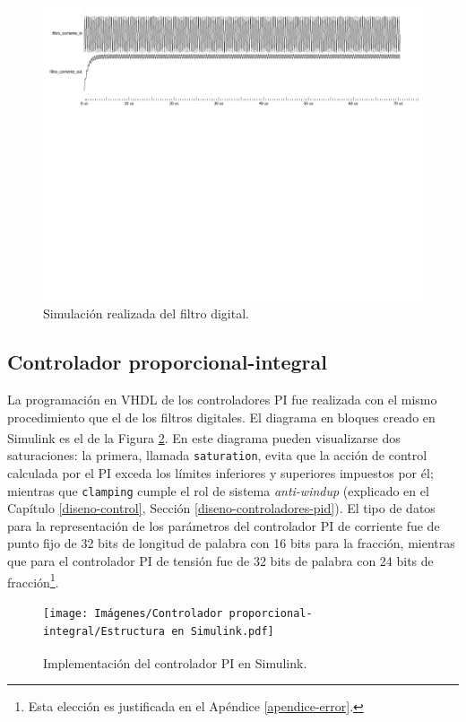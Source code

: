 \begin{figure}[hbt!]
    \centering
    \includegraphics[width=0.85\columnwidth]{Imágenes/Filtro digital/Simulación en ModelSim.pdf}    
    \caption{Simulación realizada del filtro digital.}
    \label{simulacion-filtro}
\end{figure} 

\subsection{Controlador proporcional-integral}
\label{implementacion-pid}

La programación en VHDL de los controladores PI fue realizada con el mismo procedimiento que el de los filtros digitales. El diagrama en bloques creado en Simulink\textsuperscript\textregistered\hspace{0.05pt} es el de la Figura \ref{estructura-pi}. En este diagrama pueden visualizarse dos saturaciones: la primera, llamada \texttt{saturation}, evita que la acción de control calculada por el PI exceda los límites inferiores y superiores impuestos por él; mientras que \texttt{clamping} cumple el rol de sistema \emph{anti-windup} (explicado en el Capítulo \ref{diseno-control}, Sección \ref{diseno-controladores-pid}). El tipo de datos para la representación de los parámetros del controlador PI de corriente fue de punto fijo de 32 bits de longitud de palabra con 16 bits para la fracción, mientras que para el controlador PI de tensión fue de 32 bits de palabra con 24 bits de fracción\footnote{Esta elección es justificada en el Apéndice \ref{apendice-error}.}.

\begin{figure}[hbt!]
    \centering
    \texttt{[image: Imágenes/Controlador proporcional-integral/Estructura en Simulink.pdf]}    
    \caption{Implementación del controlador PI en Simulink\textsuperscript\textregistered.}
    \label{estructura-pi}
\end{figure}

